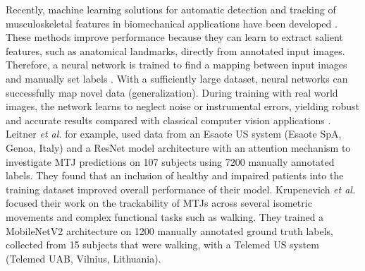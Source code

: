 \documentclass[journal,twoside,web]{ieeecolor}
\begin{document}
Recently, machine learning solutions for automatic detection and tracking of musculoskeletal features in biomechanical applications have been developed \cite{j:Cronin2020}. These methods improve performance because they can learn to extract salient features, such as anatomical landmarks, directly from annotated input images. Therefore, a neural network is trained to find a mapping between input images and manually set labels \cite{Goodfellow-et-al-2016, lecun2015deep}. With a sufficiently large dataset, neural networks can successfully map novel data (generalization). During training with real world images, the network learns to neglect noise or instrumental errors, yielding robust and accurate results compared with classical computer vision applications \cite{c:Englmair2020}. Leitner \textit{et al.} \cite{c:LeitnerJarolim2020} for example, used data from an Esaote US system (Esaote SpA, Genoa, Italy) and a ResNet model architecture \cite{c:He2016} with an attention mechanism \cite{j:Jetley2018} to investigate MTJ predictions on 107 subjects using 7200 manually annotated labels. They found that an inclusion of healthy and impaired patients into the training dataset improved overall performance of their model. Krupenevich \textit{et al.} \cite{j:Krupenevich2021} focused their work on the trackability of MTJs across several isometric movements and complex functional tasks such as walking. They trained a MobileNetV2 \cite{c:Sandler2018} architecture on 1200 manually annotated ground truth labels, collected from 15 subjects that were walking, with a Telemed US system (Telemed UAB, Vilnius, Lithuania). 
\end{document}
